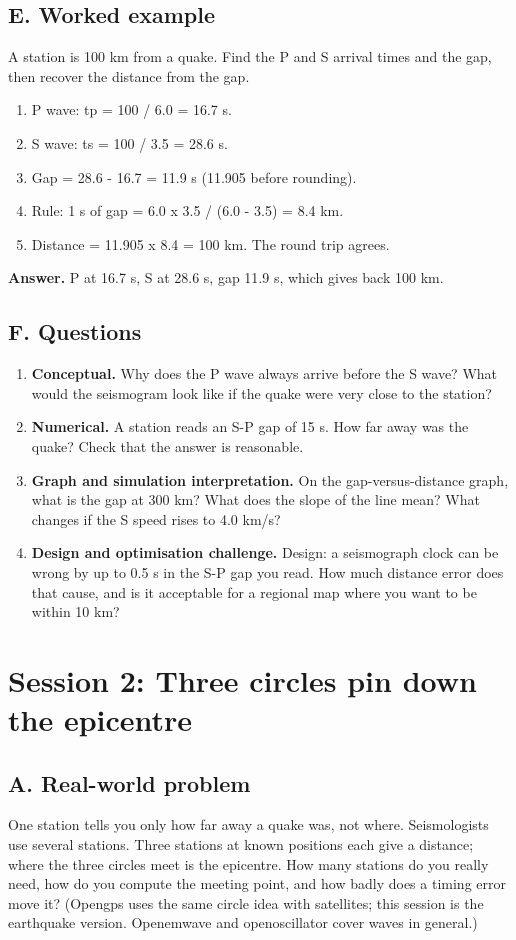 \documentclass[11pt,a4paper]{article}
\begin{document}
\subsection*{E. Worked example}
A station is 100 km from a quake. Find the P and S arrival times and the gap, then recover the distance from the gap.
\begin{enumerate}[nosep]
\item P wave: tp = 100 / 6.0 = 16.7 s.
\item S wave: ts = 100 / 3.5 = 28.6 s.
\item Gap = 28.6 - 16.7 = 11.9 s (11.905 before rounding).
\item Rule: 1 s of gap = 6.0 x 3.5 / (6.0 - 3.5) = 8.4 km.
\item Distance = 11.905 x 8.4 = 100 km. The round trip agrees.
\end{enumerate}
\textbf{Answer.} P at 16.7 s, S at 28.6 s, gap 11.9 s, which gives back 100 km.

\subsection*{F. Questions}
\begin{enumerate}[nosep]
\item \textbf{Conceptual.} Why does the P wave always arrive before the S wave? What would the seismogram look like if the quake were very close to the station?
\item \textbf{Numerical.} A station reads an S-P gap of 15 s. How far away was the quake? Check that the answer is reasonable.
\item \textbf{Graph and simulation interpretation.} On the gap-versus-distance graph, what is the gap at 300 km? What does the slope of the line mean? What changes if the S speed rises to 4.0 km/s?
\item \textbf{Design and optimisation challenge.} Design: a seismograph clock can be wrong by up to 0.5 s in the S-P gap you read. How much distance error does that cause, and is it acceptable for a regional map where you want to be within 10 km?
\end{enumerate}

\section{Session 2: Three circles pin down the epicentre}

\subsection*{A. Real-world problem}
One station tells you only how far away a quake was, not where. Seismologists use several stations. Three stations at known positions each give a distance; where the three circles meet is the epicentre. How many stations do you really need, how do you compute the meeting point, and how badly does a timing error move it? (Opengps uses the same circle idea with satellites; this session is the earthquake version. Openemwave and openoscillator cover waves in general.)
\end{document}
